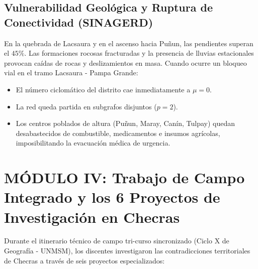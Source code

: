 \documentclass[11pt,a4paper]{article}
\begin{document}
\subsection{Vulnerabilidad Geológica y Ruptura de Conectividad (SINAGERD)}
En la quebrada de Lacsaura y en el ascenso hacia Puñun, las pendientes superan el $45\%$. Las formaciones rocosas fracturadas y la presencia de lluvias estacionales provocan caídas de rocas y deslizamientos en masa. Cuando ocurre un bloqueo vial en el tramo Lacsaura - Pampa Grande:
\begin{itemize}
    \item El número ciclomático del distrito cae inmediatamente a $\mu = 0$.
    \item La red queda partida en subgrafos disjuntos ($p = 2$).
    \item Los centros poblados de altura (Puñun, Maray, Canín, Tulpay) quedan desabastecidos de combustible, medicamentos e insumos agrícolas, imposibilitando la evacuación médica de urgencia.
\end{itemize}

\newpage
\section{MÓDULO IV: Trabajo de Campo Integrado y los 6 Proyectos de Investigación en Checras}

Durante el itinerario técnico de campo tri-curso sincronizado (Ciclo X de Geografía - UNMSM), los discentes investigaron las contradicciones territoriales de Checras a través de seis proyectos especializados:
\end{document}
